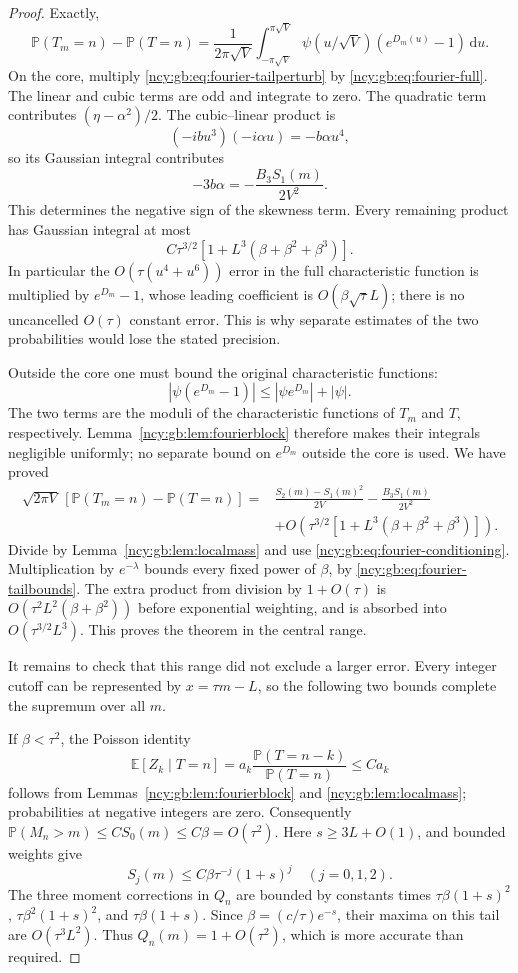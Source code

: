 \documentclass[11pt,letterpaper]{article}
\numberwithin{equation}{section}
\theoremstyle{remark}\newtheorem{remark}[theorem]{Remark}
\newcommand{\dd}{\,\mathrm d}
\theoremstyle{definition}\newtheorem{definition}[theorem]{Definition}\theoremstyle{plain}
\newcommand{\E}{\mathbb E}
\newcommand{\Pbb}{\mathbb P}
\begin{document}
\begin{proof}
Exactly,
\[
 \Pbb(T_m=n)-\Pbb(T=n)
 =\frac1{2\pi\sqrt V}
 \int_{-\pi\sqrt V}^{\pi\sqrt V}
 \psi(u/\sqrt V)(e^{D_m(u)}-1)\dd u.
\]
On the core, multiply \eqref{ncy:gb:eq:fourier-tailperturb} by
\eqref{ncy:gb:eq:fourier-full}.  The linear and cubic terms are odd and integrate
to zero.  The quadratic term contributes $(\eta-\alpha^2)/2$.  The
cubic--linear product is
\[
 (-ibu^3)(-i\alpha u)=-b\alpha u^4,
\]
so its Gaussian integral contributes
\[
 -3b\alpha=-\frac{B_3S_1(m)}{2V^2}.
\]
This determines the negative sign of the skewness term.  Every remaining
product has Gaussian integral at most
\[
 C\tau^{3/2}\left[1+L^3(\beta+\beta^2+\beta^3)\right].
\]
In particular the $O(\tau(u^4+u^6))$ error in the full characteristic
function is multiplied by $e^{D_m}-1$, whose leading coefficient is
$O(\beta\sqrt\tau L)$; there is no uncancelled $O(\tau)$ constant
error.  This is why separate estimates of the two probabilities would
lose the stated precision.

Outside the core one must bound the original characteristic functions:
\[
 |\psi(e^{D_m}-1)|\leq|\psi e^{D_m}|+|\psi|.
\]
The two terms are the moduli of the characteristic functions of $T_m$
and $T$, respectively.  Lemma~\ref{ncy:gb:lem:fourierblock} therefore makes
their integrals negligible uniformly; no separate bound on $e^{D_m}$
outside the core is used.  We have proved
\begin{align*}
 \sqrt{2\pi V}\,[\Pbb(T_m=n)-\Pbb(T=n)]
 ={}&\frac{S_2(m)-S_1(m)^2}{2V}
       -\frac{B_3S_1(m)}{2V^2}\\
 &+O\!\left(\tau^{3/2}
       [1+L^3(\beta+\beta^2+\beta^3)]\right).
\end{align*}
Divide by Lemma~\ref{ncy:gb:lem:localmass} and use
\eqref{ncy:gb:eq:fourier-conditioning}.  Multiplication by $e^{-\lambda}$
bounds every fixed power of $\beta$, by
\eqref{ncy:gb:eq:fourier-tailbounds}.  The extra product from division by
$1+O(\tau)$ is
$O(\tau^2L^2(\beta+\beta^2))$ before exponential weighting, and is
absorbed into $O(\tau^{3/2}L^3)$.  This proves the theorem in the
central range.

It remains to check that this range did not exclude a larger error.
Every integer cutoff can be represented by $x=\tau m-L$, so the
following two bounds complete the supremum over all $m$.

If $\beta<\tau^2$, the Poisson identity
\[
 \E[Z_k\mid T=n]
 =a_k\frac{\Pbb(T=n-k)}{\Pbb(T=n)}
 \leq C a_k
\]
follows from Lemmas~\ref{ncy:gb:lem:fourierblock} and
\ref{ncy:gb:lem:localmass}; probabilities at negative integers are zero.
Consequently $\Pbb(M_n>m)\leq C S_0(m)\leq C\beta=O(\tau^2)$.
Here $s\geq3L+O(1)$, and bounded weights give
\[
 S_j(m)\leq C\beta\tau^{-j}(1+s)^j\quad(j=0,1,2).
\]
The three moment corrections in $Q_n$ are bounded by constants times
$\tau\beta(1+s)^2$, $\tau\beta^2(1+s)^2$, and
$\tau\beta(1+s)$.  Since $\beta=(c/\tau)e^{-s}$, their maxima on this
tail are $O(\tau^3L^2)$.  Thus $Q_n(m)=1+O(\tau^2)$, which is more
accurate than required.


\end{proof}
\end{document}
